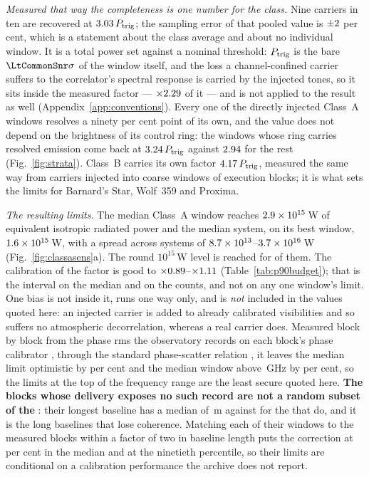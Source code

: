 \emph{Measured that way the completeness is one number for the class.} Nine
carriers in ten are recovered at $3.03\,P_{\rm trig}$; the sampling
error of that pooled value is $\pm2$ per cent, which is a statement
about the class average and about no individual window. It is a total power
set against a nominal threshold: $P_{\rm trig}$ is the bare
$\LtCommonSnr\sigma$ of the window itself, and the loss a channel-confined
carrier suffers to the correlator's spectral response is carried by the
injected tones, so it sits inside the measured factor --- $\times2.29$
of it --- and is not applied to the result as well
(Appendix~\ref{app:conventions}). Every one of the
\SensNInj{} directly injected Class~A windows resolves a ninety per cent point
of its own, and the value does not depend on the brightness of its control
ring: the \SensNRingHi{} windows whose ring carries resolved emission come
back at $3.24\,P_{\rm trig}$ against $2.94$ for the rest
(Fig.~\ref{fig:strata}). Class~B carries
its own factor $4.17\,P_{\rm trig}$, measured the same way from
\SensNToneCoarse{} carriers injected into \SensNInjCoarse{} coarse windows of
\SensNInjCoarseBlock{} execution blocks; it is what sets the limits for
Barnard's Star, Wolf~359 and Proxima.

\emph{The resulting limits.} The median Class~A window reaches
$2.9\times10^{15}$\,W of equivalent isotropic radiated power and the median
system, on its best window, $1.6\times10^{15}$\,W, with a spread across
systems of $8.7\times10^{13}$--$3.7\times10^{16}$\,W
(Fig.~\ref{fig:classasens}a). The round $10^{15}$\,W level is reached for
\NSysEfifteen{} of them. The calibration of the factor is good to
$\times0.89$--$\times1.11$ (Table~\ref{tab:p90budget}); that is
the interval on the median and on the counts, and not on any one window's
limit. One bias is not inside it, runs one way only, and is \emph{not}
included in the values quoted here: an injected carrier is
added to already calibrated visibilities and so suffers no atmospheric
decorrelation, whereas a real carrier does. Measured block by block from the
phase rms the observatory records on each block's phase calibrator
\citep[\S10.4.9]{ALMAHandbook}, through the standard phase-scatter relation
\citep[Eq.~3]{Richards2022}, it leaves the median limit optimistic by
\SensDecorPct{} per cent and the median window above \SensDecorHiGHz{}\,GHz by
\SensDecorHiPct{} per cent, so the limits at the top of the frequency range
are the least secure quoted here. \textbf{The \RpDecNUn{} blocks whose
delivery exposes no such record are not a random subset of the
\SensDecorNBlkTot}: their longest baseline has a median of \RpDecBlUn\,m
against \RpDecBlMeas{} for the \SensDecorNBlk{} that do, and it is the long
baselines that lose coherence. Matching each of their windows to the measured
blocks within a factor of two in baseline length puts the correction at
\RpDecMatchMed{} per cent in the median and \RpDecMatchHi{} at the ninetieth
percentile, so their limits are conditional on a calibration performance the
archive does not report.

